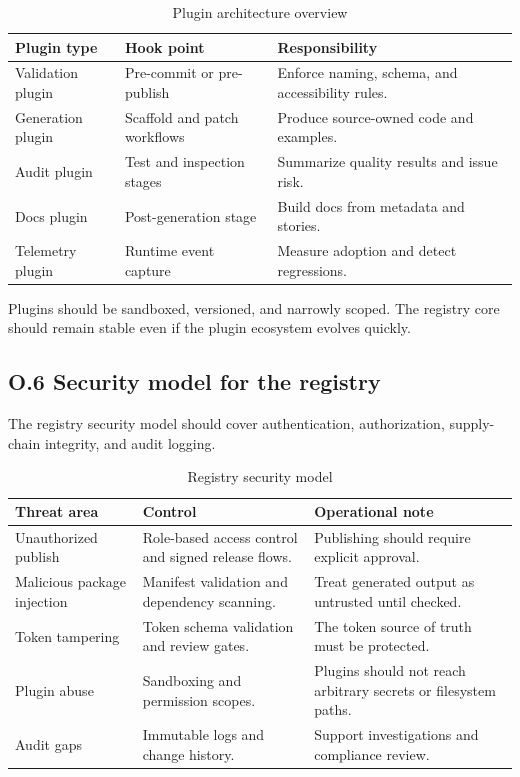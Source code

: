 \begin{table}[htbp]
  \centering
  \caption{Plugin architecture overview}
  \begin{tabularx}{\textwidth}{@{}p{}p{}Y@{}}
    \toprule
    \textbf{Plugin type} & \textbf{Hook point} & \textbf{Responsibility} \\
    \midrule
    Validation plugin & Pre-commit or pre-publish & Enforce naming, schema, and accessibility rules. \\
    Generation plugin & Scaffold and patch workflows & Produce source-owned code and examples. \\
    Audit plugin & Test and inspection stages & Summarize quality results and issue risk. \\
    Docs plugin & Post-generation stage & Build docs from metadata and stories. \\
    Telemetry plugin & Runtime event capture & Measure adoption and detect regressions. \\
    \bottomrule
  \end{tabularx}
\end{table}

Plugins should be sandboxed, versioned, and narrowly scoped. The registry core should remain stable even if the plugin ecosystem evolves quickly.

\subsection*{O.6 Security model for the registry}
The registry security model should cover authentication, authorization, supply-chain integrity, and audit logging.

\begin{table}[htbp]
  \centering
  \caption{Registry security model}
  \begin{tabularx}{\textwidth}{@{}p{}p{}Y@{}}
    \toprule
    \textbf{Threat area} & \textbf{Control} & \textbf{Operational note} \\
    \midrule
    Unauthorized publish & Role-based access control and signed release flows. & Publishing should require explicit approval. \\
    Malicious package injection & Manifest validation and dependency scanning. & Treat generated output as untrusted until checked. \\
    Token tampering & Token schema validation and review gates. & The token source of truth must be protected. \\
    Plugin abuse & Sandboxing and permission scopes. & Plugins should not reach arbitrary secrets or filesystem paths. \\
    Audit gaps & Immutable logs and change history. & Support investigations and compliance review. \\
    \bottomrule
  \end{tabularx}
\end{table}

